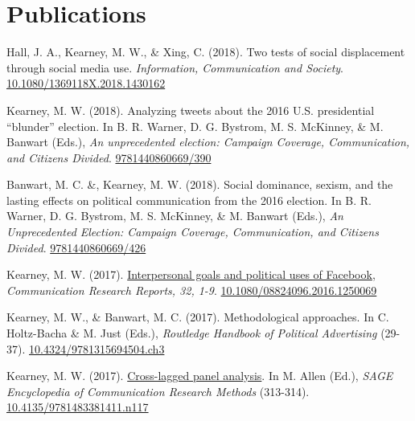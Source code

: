 \documentclass[11pt,letterpaper]{article}
\begin{document}
\section{Publications}
  \begin{bibenum}
    \item Hall, J. A., Kearney, M. W., \& Xing, C. (2018).
    Two tests of social displacement through social media use.
    \textit{Information, Communication and Society}.
    \href{https://doi.org/10.1080/1369118X.2018.1430162}{10.1080/1369118X.2018.1430162}

    \item Kearney, M. W. (2018).
    Analyzing tweets about the 2016 U.S. presidential ``blunder'' election.
    In B. R. Warner, D. G. Bystrom, M. S. McKinney, \& M. Banwart (Eds.),
    \textit{An unprecedented election: Campaign Coverage, Communication, and Citizens Divided}.
    \href{http://publisher.abc-clio.com/9781440860669/390}{9781440860669/390}

    \item Banwart, M. C. \&, Kearney, M. W. (2018).
    Social dominance, sexism, and the lasting effects on political communication from the 2016 election. In B. R. Warner,
    D. G. Bystrom, M. S. McKinney, \& M. Banwart (Eds.),
    \textit{An Unprecedented Election: Campaign Coverage, Communication, and Citizens Divided}.
    \href{http://publisher.abc-clio.com/9781440860669/426}{9781440860669/426}

    \item Kearney, M. W. (2017).
    \href{http://www.tandfonline.com/doi/abs/10.1080/08824096.2016.1250069}{Interpersonal goals and political uses of Facebook},
    \textit{Communication Research Reports, 32, 1-9}.
    \href{https://doi.org/10.1080/08824096.2016.1250069}{10.1080/08824096.2016.1250069}

    \item[] Kearney, M. W., \& Banwart, M. C. (2017).
    Methodological approaches.
    In C. Holtz-Bacha \& M. Just (Eds.), \textit{Routledge Handbook of Political Advertising} (29-37).
    \href{https://www.routledgehandbooks.com/doi/10.4324/9781315694504.ch3}{10.4324/9781315694504.ch3}

    \item[] Kearney, M. W. (2017).
    \href{http://mikewk.com/clpm.pdf}{Cross-lagged panel analysis}.
    In M. Allen (Ed.), \textit{SAGE Encyclopedia of Communication Research Methods} (313-314).
    \href{http://dx.doi.org/10.4135/9781483381411.n117}{10.4135/9781483381411.n117}


\end{bibenum}
\end{document}
